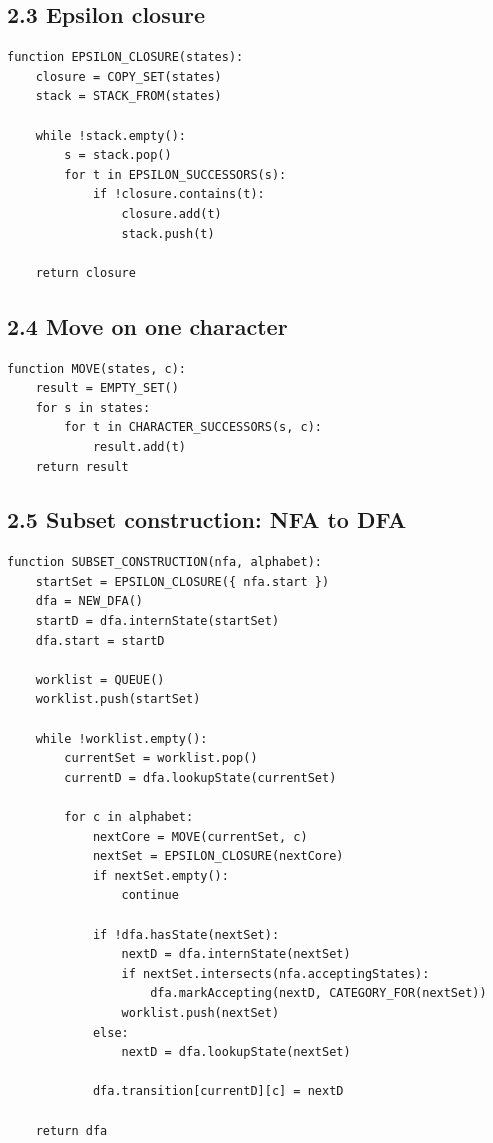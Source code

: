 \documentclass[10pt,letterpaper]{article}
\begin{document}
\subsection*{2.3 Epsilon closure}

\begin{verbatim}
function EPSILON_CLOSURE(states):
    closure = COPY_SET(states)
    stack = STACK_FROM(states)

    while !stack.empty():
        s = stack.pop()
        for t in EPSILON_SUCCESSORS(s):
            if !closure.contains(t):
                closure.add(t)
                stack.push(t)

    return closure
\end{verbatim}

\subsection*{2.4 Move on one character}

\begin{verbatim}
function MOVE(states, c):
    result = EMPTY_SET()
    for s in states:
        for t in CHARACTER_SUCCESSORS(s, c):
            result.add(t)
    return result
\end{verbatim}

\subsection*{2.5 Subset construction: NFA to DFA}

\begin{verbatim}
function SUBSET_CONSTRUCTION(nfa, alphabet):
    startSet = EPSILON_CLOSURE({ nfa.start })
    dfa = NEW_DFA()
    startD = dfa.internState(startSet)
    dfa.start = startD

    worklist = QUEUE()
    worklist.push(startSet)

    while !worklist.empty():
        currentSet = worklist.pop()
        currentD = dfa.lookupState(currentSet)

        for c in alphabet:
            nextCore = MOVE(currentSet, c)
            nextSet = EPSILON_CLOSURE(nextCore)
            if nextSet.empty():
                continue

            if !dfa.hasState(nextSet):
                nextD = dfa.internState(nextSet)
                if nextSet.intersects(nfa.acceptingStates):
                    dfa.markAccepting(nextD, CATEGORY_FOR(nextSet))
                worklist.push(nextSet)
            else:
                nextD = dfa.lookupState(nextSet)

            dfa.transition[currentD][c] = nextD

    return dfa
\end{verbatim}
\end{document}
